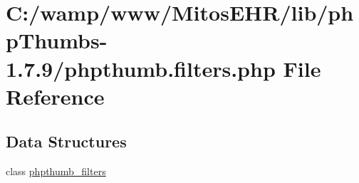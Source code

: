 \hypertarget{phpthumb_8filters_8php}{\section{\-C\-:/wamp/www/\-Mitos\-E\-H\-R/lib/php\-Thumbs-\/1.7.9/phpthumb.filters.\-php \-File \-Reference}
\label{phpthumb_8filters_8php}
}
\subsection*{\-Data \-Structures}
\begin{DoxyCompactItemize}
\item 
class \hyperlink{classphpthumb__filters}{phpthumb\-\_\-filters}
\end{DoxyCompactItemize}
